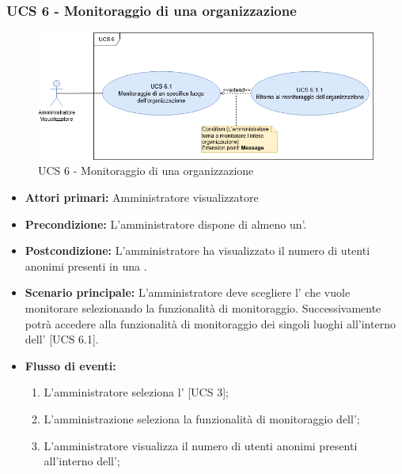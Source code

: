 \subsubsection{UCS 6 - Monitoraggio di una organizzazione}

\begin{figure}[h]
	\centering
    \includegraphics[scale=0.40]{Sezioni/UseCase/Immagini/UCS6.png}
    \caption{UCS 6 - Monitoraggio di una organizzazione}
\end{figure}

\begin{itemize}
	\item \textbf{Attori primari:} Amministratore visualizzatore
	\item \textbf{Precondizione:} L'amministratore dispone di almeno un'.
	\item \textbf{Postcondizione:} L'amministratore ha visualizzato il numero di utenti anonimi presenti in una .
	\item \textbf{Scenario principale:} L'amministratore deve scegliere l' che vuole monitorare selezionando la funzionalità di monitoraggio. Successivamente potrà accedere alla funzionalità di monitoraggio dei singoli luoghi all'interno dell' [UCS 6.1].
	\item \textbf{Flusso di eventi:}
\begin{enumerate}
	\item L'amministratore seleziona l' [UCS 3]; 
	\item L'amministrazione seleziona la funzionalità di monitoraggio dell';
	\item L'amministratore visualizza il numero di utenti anonimi presenti all'interno dell';
\end{enumerate}
\end{itemize}

